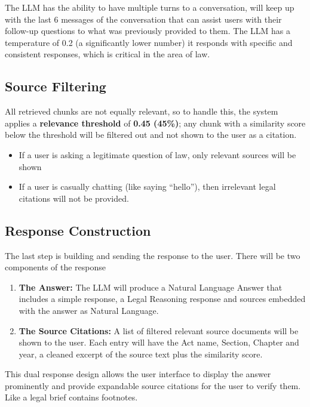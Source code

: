 \documentclass[12pt,a4paper]{article}
\begin{document}
The LLM has the ability to have multiple turns to a conversation, will keep up with the last 6 messages of the conversation that can assist users with their follow-up questions to what was previously provided to them. The LLM has a temperature of 0.2 (a significantly lower number) it responds with specific and consistent responses, which is critical in the area of law. 

\subsection{Source Filtering}

All retrieved chunks are not equally relevant, so to handle this, the system applies a \textbf{relevance threshold} of \textbf{0.45 (45\%)}; any chunk with a similarity score below the threshold will be filtered out and not shown to the user as a citation.


\begin{itemize}
  \item If a user is asking a legitimate question of law, only relevant sources will be shown
  \item If a user is casually chatting (like saying ``hello''), then irrelevant legal citations will not be provided.
\end{itemize}

\subsection{Response Construction}

The last step is building and sending the response to the user. There will be two components of the response
\begin{enumerate}
  \item \textbf{The Answer:} The LLM will produce a Natural Language Answer that includes a simple response, a Legal Reasoning response and sources embedded with the answer as Natural Language.

  \item \textbf{The Source Citations:} A list of filtered relevant source documents will be shown to the user. Each entry will have the Act name, Section, Chapter and year, a cleaned excerpt of the source text plus the similarity score.
\end{enumerate}

This dual response design allows the user interface to display the answer prominently and provide expandable source citations for the user to verify them. Like a legal brief contains footnotes.
\end{document}
